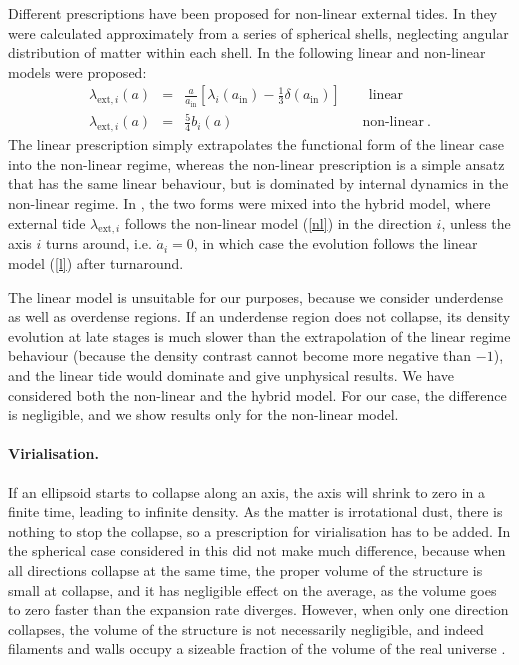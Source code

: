 \documentclass[11pt, a4paper]{article}
\newcommand{\bea}{\begin{eqnarray}} \newcommand{\eea}{\end{eqnarray}}
\newcommand{\re}[1]{(\ref{#1})}
\newcommand{\para}{\paragraph}
\renewcommand{\d}{\delta}
\renewcommand{\l}{\lambda}
\newcommand{\adot}{\dot{a}}
\renewcommand{\in}{\textrm{in}}
\newcommand{\lei}{\l_{\mathrm{ext},i}}
\begin{document}
Different prescriptions have been proposed for non-linear external tides. In \cite{Eisenstein:1994ni} they were calculated approximately from a series of spherical shells, neglecting angular distribution of matter within each shell. In \cite{Bond:1996} the following linear and non-linear models were proposed:
\bea
  \label{l} \lei(a) &=& \frac{a}{a_\in} \left[ \l_i(a_\in) - \frac{1}{3} \d(a_\in) \right] \qquad \textrm{linear} \\
  \label{nl} \lei(a) &=& \frac{5}{4} b_i(a) \qquad\qquad\qquad\qquad\quad\ \textrm{non-linear} \ .
\eea
%
The linear prescription simply extrapolates the functional form of the linear case into the non-linear regime, whereas the non-linear prescription is a simple ansatz that has the same linear behaviour, but is dominated by internal dynamics in the non-linear regime. In \cite{Angrick:2010qg}, the two forms were mixed into the hybrid model, where external tide $\lei$ follows the non-linear model \re{nl} in the direction $i$, unless the axis $i$ turns around, i.e. $\adot_i=0$, in which case the evolution follows the linear model \re{l} after turnaround.

The linear model is unsuitable for our purposes, because we consider underdense as well as overdense regions. If an underdense region does not collapse, its density evolution at late stages is much slower than the extrapolation of the linear regime behaviour (because the density contrast cannot become more negative than $-1$), and the linear tide would dominate and give unphysical results.
We have considered both the non-linear and the hybrid model. For our case, the difference is negligible, and we show results only for the non-linear model.

\para{Virialisation.}

If an ellipsoid starts to collapse along an axis, the axis will shrink to zero in a finite time, leading to infinite density. As the matter is irrotational dust, there is nothing to stop the collapse, so a prescription for virialisation has to be added. In the spherical case considered in \cite{Rasanen:2008it} this did not make much difference, because when all directions collapse at the same time, the proper volume of the structure is small at collapse, and it has negligible effect on the average, as the volume goes to zero faster than the expansion rate diverges. However, when only one direction collapses, the volume of the structure is not necessarily negligible, and indeed filaments and walls occupy a sizeable fraction of the volume of the real universe \cite{Bond:1995yt, Cautun:2014fwa}.
\end{document}
